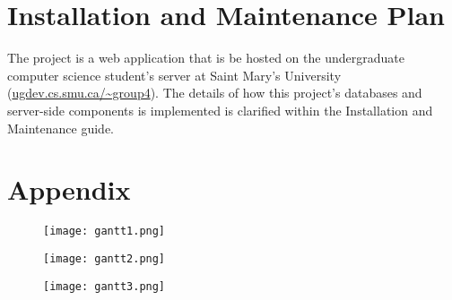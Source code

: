 \documentclass[11pt]{article}
\begin{document}
\section{Installation and Maintenance Plan}

The project is a web application that is be hosted on the undergraduate computer science student's
server at Saint Mary's University (\url{ugdev.cs.smu.ca/~group4}). The details of how this project's
databases and server-side components is implemented is clarified within the Installation and
Maintenance guide.

\pagebreak
\section*{Appendix}

\begin{figure}[H]
\texttt{[image: gantt1.png]}
\centering
\end{figure}

\begin{figure}[H]
\texttt{[image: gantt2.png]}
\centering
\end{figure}

\begin{figure}[H]
\texttt{[image: gantt3.png]}
\centering
\end{figure}
\end{document}
